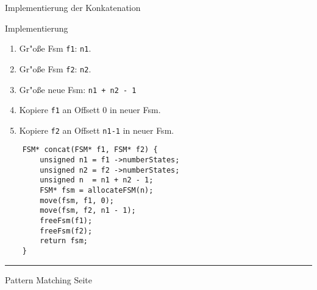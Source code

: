 \begin{slide}{}
\normalsize

\begin{center}
Implementierung der Konkatenation
\end{center}
\vspace*{0.5cm}

\footnotesize
\hspace*{1.3cm} \raisebox{1cm}{Start $\rightarrow$}

Implementierung
\begin{enumerate}
\item Gr"o{\ss}e Fsm \texttt{f1}: \texttt{n1}.
\item Gr"o{\ss}e Fsm \texttt{f2}: \texttt{n2}.
\item Gr"o{\ss}e neue Fsm: \texttt{n1 + n2 - 1}
\item Kopiere \texttt{f1} an Offsett 0 in neuer Fsm.
\item Kopiere \texttt{f2} an Offsett \texttt{n1-1} in neuer Fsm.
\end{enumerate}
\vspace*{0.5cm}

\begin{verbatim}
    FSM* concat(FSM* f1, FSM* f2) {
        unsigned n1 = f1 ->numberStates;
        unsigned n2 = f2 ->numberStates;
        unsigned n  = n1 + n2 - 1;
        FSM* fsm = allocateFSM(n);
        move(fsm, f1, 0);
        move(fsm, f2, n1 - 1);
        freeFsm(f1);
        freeFsm(f2);
        return fsm;
    }
\end{verbatim}

\vspace*{\fill}
\tiny \addtocounter{mypage}{1}
\rule{17cm}{1mm}
Pattern Matching \hspace*{\fill} Seite 
\end{slide}


